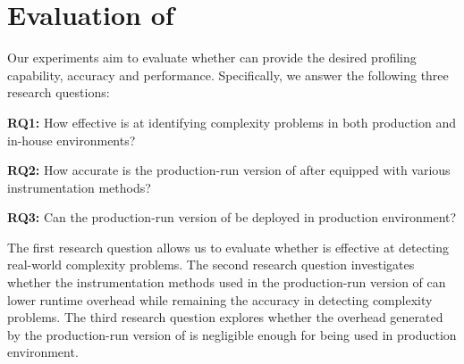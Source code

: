 \section{Evaluation of \Tool}
\label{sec:eva}



Our experiments aim to evaluate whether \Tool 
can provide the desired profiling capability, accuracy and performance. 
Specifically, we answer the following three research questions:


\vspace*{3pt}
\noindent
 {\bf RQ1:} 
How effective is \Tool at identifying complexity problems
in both production and in-house environments?

\vspace*{3pt}
\noindent
{\bf RQ2:}
How accurate is the production-run version of \Tool after 
equipped with various instrumentation methods?


\vspace*{3pt}
\noindent
{\bf RQ3:}
Can the production-run version of \Tool be deployed
in production environment?







\vspace*{2pt}


The first research question allows us to evaluate whether \Tool is effective 
at detecting real-world complexity problems. 
The second research question investigates whether the instrumentation methods 
used in the production-run version of \Tool can lower runtime overhead 
while remaining
the accuracy in detecting complexity problems. 
The third research question explores whether the overhead generated 
by the production-run version of \Tool is negligible 
enough for being used in production environment.





